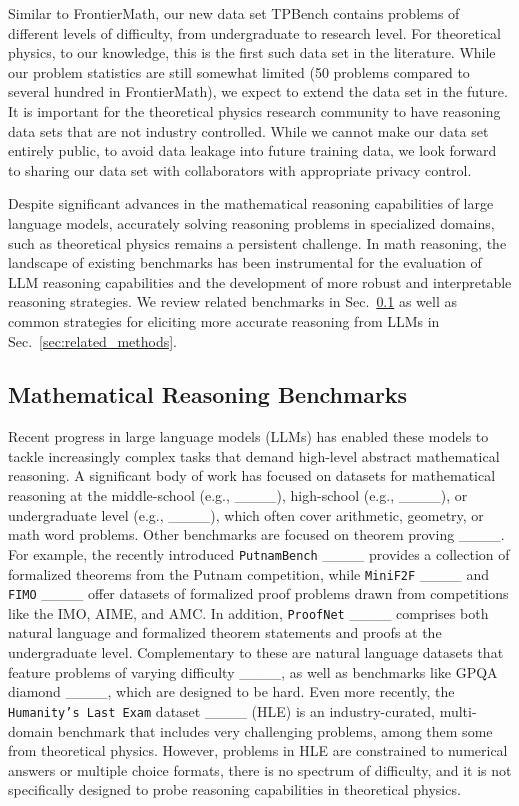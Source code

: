 Similar to FrontierMath, our new data set TPBench contains problems of different levels of difficulty, from undergraduate to research level. For theoretical physics, to our knowledge, this is the first such data set in the literature. While our problem statistics are still somewhat limited (50 problems compared to several hundred in FrontierMath), we expect to extend the data set in the future. It is important for the theoretical physics research community to have reasoning data sets that are not industry controlled. While we cannot make our data set entirely public, to avoid data leakage into future training data, we look forward to sharing our data set with collaborators with appropriate privacy control. 
\fi


Despite significant advances in the mathematical reasoning capabilities of large language models, accurately solving reasoning problems in specialized domains, such as theoretical physics remains a persistent challenge. In math reasoning, the landscape of existing benchmarks has been instrumental for the evaluation of LLM reasoning capabilities and the development of more robust and interpretable reasoning strategies. We review related benchmarks in Sec.~\ref{sec:related_benchmarks} as well as common strategies for eliciting more accurate reasoning from LLMs in Sec.~\ref{sec:related_methods}.

\subsection{Mathematical Reasoning Benchmarks}
\label{sec:related_benchmarks}
Recent progress in large language models (LLMs) has enabled these models to tackle increasingly complex tasks that demand high-level abstract mathematical reasoning. A significant body of work has focused on datasets for mathematical reasoning at the middle-school (e.g., ____), high-school (e.g., ____), or undergraduate level (e.g., ____), which often cover arithmetic, geometry, or math word problems. Other benchmarks are focused on theorem proving ____. For example, the recently introduced \texttt{PutnamBench} ____ provides a collection of formalized theorems from the Putnam competition, while \texttt{MiniF2F} ____ and \texttt{FIMO} ____ offer datasets of formalized proof problems drawn from competitions like the IMO, AIME, and AMC. In addition, \texttt{ProofNet} ____ comprises both natural language and formalized theorem statements and proofs at the undergraduate level. Complementary to these are natural language datasets that feature problems of varying difficulty ____, as well as benchmarks like GPQA diamond ____, which are designed to be hard.
Even more recently, the \texttt{Humanity's Last Exam} dataset ____ (HLE) is an industry-curated, multi-domain benchmark that includes very challenging problems, among them some from theoretical physics. However, problems in HLE are constrained to numerical answers or multiple choice formats, there is no spectrum of difficulty, and it is not specifically designed to probe reasoning capabilities in theoretical physics.


